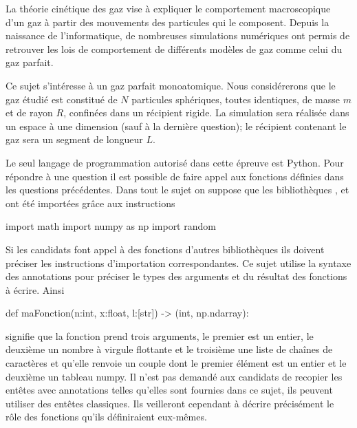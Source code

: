 \documentclass[twoside,french,11pt]{VcCours}
\begin{document}
La théorie cinétique des gaz vise à expliquer le comportement macroscopique d'un gaz à partir des mouvements
des particules qui le composent. Depuis la naissance de l'informatique, de nombreuses simulations numériques
ont permis de retrouver les lois de comportement de différents modèles de gaz comme celui du gaz parfait.

\medskip
Ce sujet s'intéresse à un gaz parfait monoatomique. Nous considérerons que le gaz étudié est constitué de $N$
particules sphériques, toutes identiques, de masse $m$ et de rayon $R$, confinées dans un récipient rigide. La
simulation sera réalisée dans un espace à une dimension (sauf à la dernière question); le récipient contenant le gaz sera
un segment de longueur $L$.


\medskip
Le seul langage de programmation autorisé dans cette épreuve est Python. Pour répondre à une
question il est possible de faire appel aux fonctions définies dans les questions précédentes. Dans tout le sujet
on suppose que les bibliothèques ,  et  ont été importées grâce aux instructions
\begin{Python*}  
import math
import numpy as np
import random
\end{Python*} 

\newpage
Si les candidats font appel à des fonctions d'autres bibliothèques ils doivent préciser 
les instructions d'importation correspondantes.
Ce sujet utilise la syntaxe des annotations pour préciser le types des arguments et du résultat des fonctions à
écrire. Ainsi
\begin{Python*}
def maFonction(n:int, x:float, l:[str]) -> (int, np.ndarray):
\end{Python*} 
signifie que la fonction  prend trois arguments, le premier est un entier, le deuxième un nombre à
virgule flottante et le troisième une liste de chaînes de caractères et qu'elle renvoie un couple dont le premier
élément est un entier et le deuxième un tableau numpy. Il n'est pas demandé aux candidats de recopier les
entêtes avec annotations telles qu'elles sont fournies dans ce sujet, ils peuvent utiliser des entêtes classiques. Ils
veilleront cependant à décrire précisément le rôle des fonctions qu'ils définiraient eux-mêmes.
\end{document}
